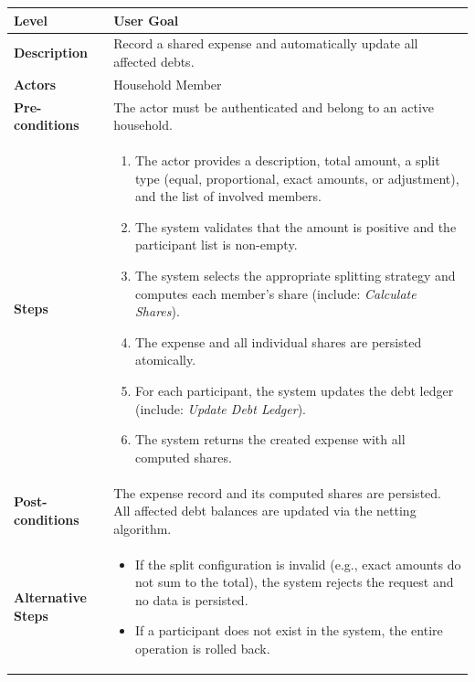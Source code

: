 \begin{longtable}{|p{3.5cm}|p{10.3cm}|}
\hline
\rowcolor{UCRow} \textbf{Level} & User Goal \\ \hline
\textbf{Description} & Record a shared expense and automatically update all affected debts. \\ \hline
\rowcolor{UCRow} \textbf{Actors} & Household Member \\ \hline
\textbf{Pre-conditions} & The actor must be authenticated and belong to an active household. \\ \hline
\rowcolor{UCRow} \textbf{Steps} &
\begin{enumerate}[nosep, leftmargin=*]
    \item The actor provides a description, total amount, a split type (equal, proportional, exact amounts, or adjustment), and the list of involved members.
    \item The system validates that the amount is positive and the participant list is non-empty.
    \item The system selects the appropriate splitting strategy and computes each member's share (include: \textit{Calculate Shares}).
    \item The expense and all individual shares are persisted atomically.
    \item For each participant, the system updates the debt ledger (include: \textit{Update Debt Ledger}).
    \item The system returns the created expense with all computed shares.
\end{enumerate} \\ \hline
\textbf{Post-conditions} & The expense record and its computed shares are persisted. All affected debt balances are updated via the netting algorithm. \\ \hline
\rowcolor{UCRow} \textbf{Alternative Steps} &
\begin{itemize}[nosep, leftmargin=2.5em]
    \item[\textbf{A1.}] If the split configuration is invalid (e.g., exact amounts do not sum to the total), the system rejects the request and no data is persisted.
    \item[\textbf{A2.}] If a participant does not exist in the system, the entire operation is rolled back.
\end{itemize} \\ \hline
\end{longtable}

